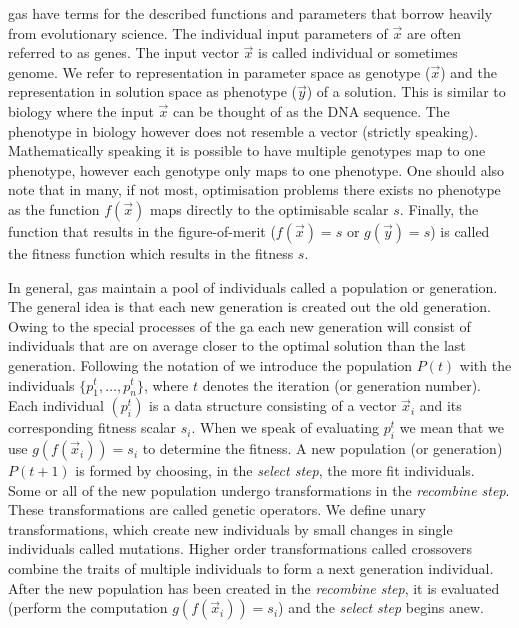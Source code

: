 \glspl{ga} have terms for the described functions and parameters that borrow heavily from evolutionary science. The individual input parameters of $\vec{x}$ are often referred to as \glspl{gene}. The input vector $\vec{x}$ is called \gls{individual} or sometimes \gls{genome}. We refer to representation in parameter space as \gls{genotype} ($\vec{x}$) and the representation in solution space as  \gls{phenotype} ($\vec{y}$) of a solution. This is similar to biology where the input $\vec{x}$ can be thought of as the DNA sequence. The \gls{phenotype} in biology however does not resemble a vector (strictly speaking).  Mathematically speaking it is possible to have multiple \glspl{genotype} map to one \gls{phenotype}, however each \gls{genotype} only maps to one phenotype. 
One should also note that in many, if not most, optimisation problems there exists no \gls{phenotype} as the function $f(\vec{x})$ maps directly to the optimisable scalar $s$. Finally, the function that results in the figure-of-merit ($f(\vec{x})=s$ or $g(\vec{y})=s$) is called the \gls{fitness} function which results in the \gls{fitness} $s$. 

In general, \glspl{ga} maintain a pool of \glspl{individual} called a population or generation. The general idea is that each new generation is created out the old generation. Owing to the special processes of the \gls{ga} each new generation will consist of \glspl{individual} that are on average closer to the optimal solution than the last generation. Following the notation of \citet{Michalewicz:1994:GAD:184675} we introduce the population $P(t)$ with the \glspl{individual}  $\{p_{1}^{t}, \dots, p_{n}^{t}\}$, where $t$ denotes the iteration (or generation number). Each individual $(p_{i}^t)$ is a data structure consisting of a vector $\vec{x}_i$ and its corresponding fitness scalar $s_i$.  When we speak of evaluating $p_{i}^{t}$ we mean that we use $g(f(\vec{x}_i))=s_i$ to determine the fitness. A new population (or generation) $P(t+1)$ is formed by choosing, in the \textit{select step}, the more fit individuals. Some or all of the new population undergo transformations in the \textit{recombine step}. These transformations are called genetic operators. We define unary transformations, which create new individuals by small changes in single individuals called \glspl{mutation}. Higher order transformations called \glspl{crossover} combine the traits of multiple individuals to form a next generation individual. 
After the new population has been created in the \textit{recombine step}, it is evaluated (perform the computation $g(f(\vec{x}_i))=s_i$) and the \textit{select step} begins anew. 

